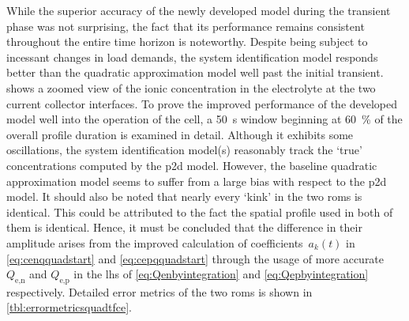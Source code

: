 While the  superior accuracy of the  newly developed model during  the transient
phase  was not  surprising, the  fact  that its  performance remains  consistent
throughout  the  entire  time  horizon  is  noteworthy.  Despite  being  subject
to  incessant  changes   in  load  demands,  the   system  identification  model
responds better  than the  quadratic approximation model  well past  the initial
transient.   shows  a  zoomed  view of  the
ionic concentration in the electrolyte  at the two current collector interfaces.
To prove the improved performance of the developed model well into the operation
of the cell, a \SI{50}{\second} window beginning at \approx \SI{60}{\percent} of
the overall  profile duration is examined  in detail. Although it  exhibits some
oscillations,  the system  identification model(s)  reasonably track  the `true'
concentrations computed by the \gls{p2d}  model. However, the baseline quadratic
approximation  model seems  to suffer  from  a large  bias with  respect to  the
\gls{p2d} model.  It should also  be noted that nearly  every `kink' in  the two
\glspl{rom}  is identical.  This could  be attributed  to the  fact the  spatial
profile  used  in  both of  them  is  identical.  Hence,  it must  be  concluded
that  the difference  in their  amplitude arises  from the  improved calculation
of coefficients~$a_k(t)$ in \cref{eq:cenqquadstart} and \cref{eq:cepqquadstart}
through  the  usage  of  more  accurate  $Q_{\text{e,n}}$  and  $Q_{\text{e,p}}$
in  the  \gls{lhs} of \cref{eq:Qenbyintegration}  and \cref{eq:Qepbyintegration}
respectively.  Detailed   error  metrics  of   the  two  \glspl{rom}   is  shown
in \cref{tbl:errormetricsquadtfce}.


